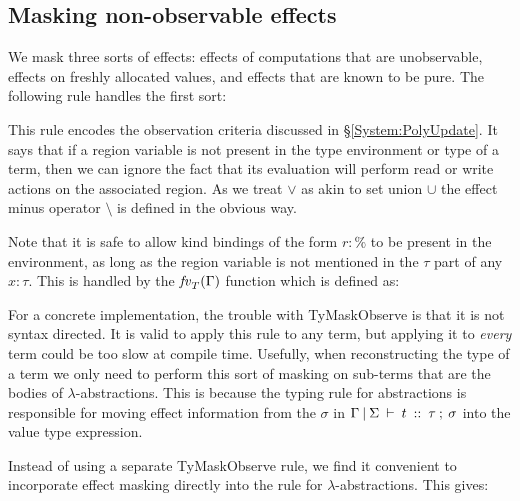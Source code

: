 
\subsection{Masking non-observable effects}
\label{Core:Masking}
We mask three sorts of effects: effects of computations that are unobservable, effects on freshly allocated values, and effects that are known to be pure. The following rule handles the first sort:


This rule encodes the observation criteria discussed in \S\ref{System:PolyUpdate}. It says that if a region variable is not present in the type environment or type of a term, then we can ignore the fact that its evaluation will perform read or write actions on the associated region. As we treat $\lor$ as akin to set union $\cup$ the effect minus operator $\setminus$ is defined in the obvious way. 

Note that it is safe to allow kind bindings of the form $r : \%$ to be present in the environment, as long as the region variable is not mentioned in the $\tau$ part of any $x : \tau$. This is handled by the $\operatorname{\mathit{fv}}_T(\Gamma)$ function which is defined as:

		

For a concrete implementation, the trouble with TyMaskObserve is that it is not syntax directed. It is valid to apply this rule to any term, but applying it to \emph{every} term could be too slow at compile time. Usefully, when reconstructing the type of a term we only need to perform this sort of masking on sub-terms that are the bodies of $\lambda$-abstractions. This is because the typing rule for abstractions is responsible for moving effect information from the $\sigma$ in $\Gamma \: \arrowvert \: \Sigma \: \vdash \: t \: :: \: \tau \: ; \: \sigma$ into the value type expression.

Instead of using a separate TyMaskObserve rule, we find it convenient to incorporate effect masking directly into the rule for $\lambda$-abstractions. This gives:


